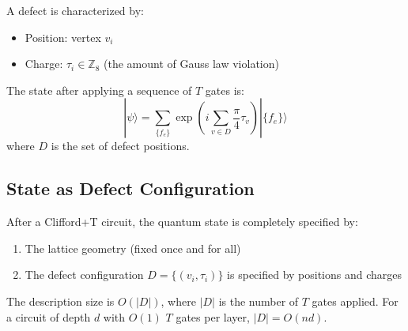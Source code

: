 A defect is characterized by:
\begin{itemize}
    \item Position: vertex $v_i$
    \item Charge: $\tau_i \in \mathbb{Z}_8$ (the amount of Gauss law violation)
\end{itemize}

The state after applying a sequence of $T$ gates is:
\begin{equation}
|\psi\rangle = \sum_{\{f_e\}} \exp\left(i \sum_{v \in D} \frac{\pi}{4} \tau_v\right) |\{f_e\}\rangle
\end{equation}
where $D$ is the set of defect positions.

\subsection{State as Defect Configuration}

After a Clifford+T circuit, the quantum state is completely specified by:
\begin{enumerate}
    \item The lattice geometry (fixed once and for all)
    \item The defect configuration $D = \{(v_i, \tau_i)\}$ is specified by positions and charges
\end{enumerate}

The description size is $O(|D|)$, where $|D|$ is the number of $T$ gates applied. For a circuit of depth $d$ with $O(1)$ $T$ gates per layer, $|D| = O(nd)$.
